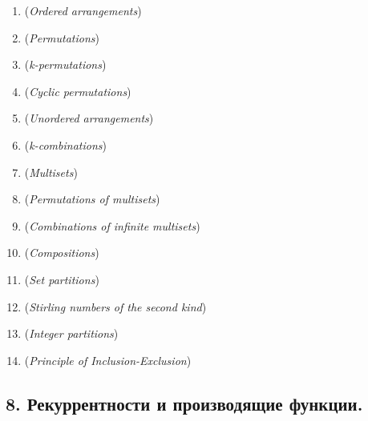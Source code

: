 \documentclass[12pt]{article}
\begin{document}
    \begin{enumerate}
        \item \textbf{} (\textit{Ordered arrangements})

        \item \textbf{} (\textit{Permutations})

        \item \textbf{} (\textit{k-permutations})

        \item \textbf{} (\textit{Cyclic permutations})

        \item \textbf{} (\textit{Unordered arrangements})

        \item \textbf{} (\textit{k-combinations})

        \item \textbf{} (\textit{Multisets})

        \item \textbf{} (\textit{Permutations of multisets})

        \item \textbf{} (\textit{Combinations of infinite multisets})

        \item \textbf{} (\textit{Compositions})

        \item \textbf{} (\textit{Set partitions})

        \item \textbf{} (\textit{Stirling numbers of the second kind})

        \item \textbf{} (\textit{Integer partitions})

        \item \textbf{} (\textit{Principle of Inclusion-Exclusion})

    \end{enumerate}

    \subsection{8. Рекуррентности и производящие функции.}
\end{document}
